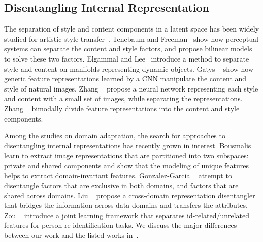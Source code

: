 \documentclass[final]{cvpr}
\begin{document}
\subsection{Disentangling Internal Representation}
The separation of style and content components in a latent space has been widely studied for artistic style transfer~\cite{tenenbaum2000separating,elgammal2004separating,gatys2016image,zhang2018style,zhang2018separating}.
Tenebaum and Freeman~\cite{tenenbaum2000separating} show how perceptual systems can separate the content and style factors, and propose bilinear models to solve these two factors.
Elgammal and Lee~\cite{elgammal2004separating} introduce a method to separate style and content on manifolds representing dynamic objects.
Gatys \etal~\cite{gatys2016image} show how generic feature representations learned by a CNN manipulate the content and style of natural images.
Zhang \etal~\cite{zhang2018separating} propose a neural network representing each style and content with a small set of images, while separating the representations.
Zhang \etal~\cite{zhang2018style} bimodally divide feature representations into the content and style components. 

Among the studies on domain adaptation, the search for approaches to disentangling internal representations has recently grown in interest.
Bousmalis \etal~\cite{bousmalis2016domain} learn to extract image representations that are partitioned into two subspaces: private and shared components and show that the modeling of unique features helps to extract domain-invariant features.
Gonzalez-Garcia \etal~\cite{gonzalez2018image} attempt to disentangle factors that are exclusive in both domains, and factors that are shared across domains.
Liu \etal~\cite{liu2018detach} propose a cross-domain representation disentangler that bridges the information across data domains and transfers the attributes.
Zou \etal~\cite{zou2020joint} introduce a joint learning framework that separates id-related/unrelated features for person re-identification tasks.
We discuss the major differences between our work and the listed works in~.
\end{document}
